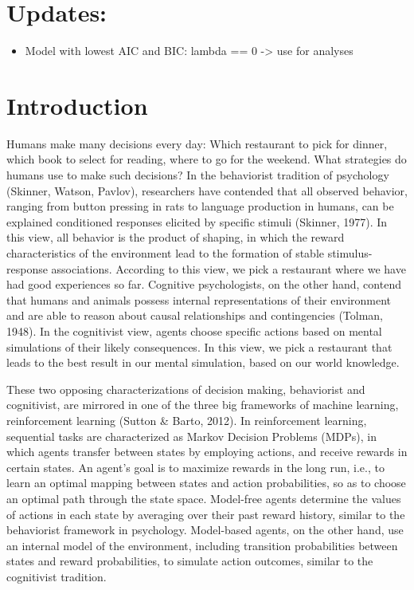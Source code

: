 \documentclass[11pt]{article} %
\begin{document}
\section{Updates:}
\begin{itemize}
	\item Model with lowest AIC and BIC: lambda == 0 -> use for analyses
\end{itemize}

\section{Introduction}

Humans make many decisions every day: Which restaurant to pick for dinner, which book to select for reading, where to go for the weekend. What strategies do humans use to make such decisions? In the behaviorist tradition of psychology (Skinner, Watson, Pavlov), researchers have contended that all observed behavior, ranging from button pressing in rats to language production in humans, can be explained conditioned responses elicited by specific stimuli (Skinner, 1977). In this view, all behavior is the product of shaping, in which the reward characteristics of the environment lead to the formation of stable stimulus-response associations. According to this view, we pick a restaurant where we have had good experiences so far. Cognitive psychologists, on the other hand, contend that humans and animals possess internal representations of their environment and are able to reason about causal relationships and contingencies (Tolman, 1948). In the cognitivist view, agents choose specific actions based on mental simulations of their likely consequences. In this view, we pick a restaurant that leads to the best result in our mental simulation, based on our world knowledge.

These two opposing characterizations of decision making, behaviorist and cognitivist, are mirrored in one of the three big frameworks of machine learning, reinforcement learning (Sutton \& Barto, 2012). In reinforcement learning, sequential tasks are characterized as Markov Decision Problems (MDPs), in which agents transfer between states by employing actions, and receive rewards in certain states. An agent's goal is to maximize rewards in the long run, i.e., to learn an optimal mapping between states and action probabilities, so as to choose an optimal path through the state space. Model-free agents determine the values of actions in each state by averaging over their past reward history, similar to the behaviorist framework in psychology. Model-based agents, on the other hand, use an internal model of the environment, including transition probabilities between states and reward probabilities, to simulate action outcomes, similar to the cognitivist tradition.
\end{document}
